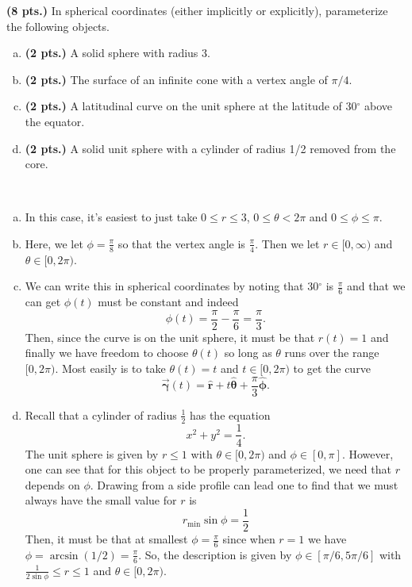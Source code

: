 \documentclass[12pt]{article} %
\newcommand{\curvegamma}{\boldsymbol{\vec{\gamma}}}
\newcommand{\rhat}{\boldsymbol{\hat{r}}}
\newcommand{\thetahat}{\boldsymbol{\hat{\theta}}}
\newcommand{\phihat}{\boldsymbol{\hat{\phi}}}
\begin{document}
\newpage
\begin{problem}
	\textbf{(8 pts.)} In spherical coordinates (either implicitly or explicitly), parameterize the following objects.
	\begin{enumerate}[(a)]
		\item \textbf{(2 pts.)} A solid sphere with radius 3.
		\item \textbf{(2 pts.)} The surface of an infinite cone with a vertex angle of $\pi/4$.
		\item \textbf{(2 pts.)} A latitudinal curve on the unit sphere at the latitude of 30$^\circ$ above the equator.
		\item \textbf{(2 pts.)} A solid unit sphere with a cylinder of radius 1/2 removed from the core.
	\end{enumerate}
\end{problem}
\begin{solution} ~
 \begin{enumerate}[(a)]
    \item In this case, it's easiest to just take $0\leq r \leq 3$, $0\leq \theta < 2\pi$ and $0\leq \phi \leq \pi$.  
    \item Here, we let $\phi=\frac{\pi}{8}$ so that the vertex angle is $\frac{\pi}{4}$.  Then we let $r\in [0,\infty)$ and $\theta \in [0,2\pi)$.
    \item We can write this in spherical coordinates by noting that 30$^\circ$ is $\frac{\pi}{6}$ and that we can get $\phi(t)$ must be constant and indeed 
    \[
    \phi(t) = \frac{\pi}{2}-\frac{\pi}{6}=\frac{\pi}{3}.
    \]
    Then, since the curve is on the unit sphere, it must be that $r(t)=1$ and finally we have freedom to choose $\theta(t)$ so long as $\theta$ runs over the range $[0,2\pi)$. Most easily is to take $\theta(t)=t$ and $t\in [0,2\pi)$ to get the curve
    \[
    \curvegamma(t) = \rhat + t \thetahat +\frac{\pi}{3} \phihat.
    \]
    \item Recall that a cylinder of radius $\frac{1}{2}$ has the equation
    \[
    x^2+y^2=\frac{1}{4}.
    \]
    The unit sphere is given by $r\leq 1$ with $\theta \in [0,2\pi)$ and $\phi \in [0,\pi]$. However, one can see that for this object to be properly parameterized, we need that $r$ depends on $\phi$.  Drawing from a side profile can lead one to find that we must always have the small value for $r$ is
    \[
    r_{\textrm{min}} \sin \phi = \frac{1}{2}
    \]
    Then, it must be that at smallest $\phi = \frac{\pi}{6}$ since when $r=1$ we have $\phi = \arcsin(1/2) = \frac{\pi}{6}$.  So, the description is given by $\phi \in [\pi/6, 5\pi/6]$ with $\frac{1}{2\sin \phi} \leq r \leq 1$ and $\theta \in [0,2\pi)$.
 \end{enumerate}
\end{solution}
\end{document}
